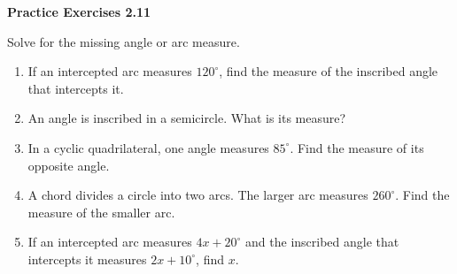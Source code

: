 \vspace{0.3ex}
\noindent\textbf{Practice Exercises 2.11}

\vspace{0.2ex}

Solve for the missing angle or arc measure.

\begin{enumerate}
    \item If an intercepted arc measures $120^\circ$, find the measure of the inscribed angle that intercepts it.
    \item An angle is inscribed in a semicircle. What is its measure?
    \item In a cyclic quadrilateral, one angle measures $85^\circ$. Find the measure of its opposite angle.
    \item A chord divides a circle into two arcs. The larger arc measures $260^\circ$. Find the measure of the smaller arc.
    \item If an intercepted arc measures $4x + 20^\circ$ and the inscribed angle that intercepts it measures $2x + 10^\circ$, find $x$.
\end{enumerate}
